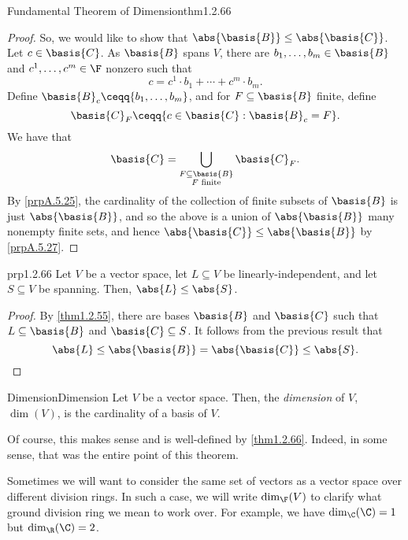 \begin{thm}{Fundamental Theorem of Dimension}{thm1.2.66}
\begin{proof}
		So, we would like to show that $\abs{\basis{B}}\leq \abs{\basis{C}}$.  Let $c\in \basis{C}$.  As $\basis{B}$ spans $V$, there are $b_1,\ldots ,b_m\in \basis{B}$ and $c^1,\ldots ,c^m\in \F$ nonzero such that
		\begin{equation}
			c=c^1\cdot b_1+\cdots +c^m\cdot b_m.
		\end{equation}
		Define $\basis{B}_c\ceqq \{ b_1,\ldots ,b_m\}$, and for $F\subseteq \basis{B}$ finite, define
		\begin{equation}
			\basis{C}_F\ceqq \{ c\in \basis{C}:\basis{B}_c=F\} .
		\end{equation}
		We have that
		\begin{equation}
			\basis{C}=\bigcup _{\substack{F\subseteq \basis{B} \\ F\text{ finite}}}\basis{C}_F.
		\end{equation}
		By \cref{prpA.5.25}, the cardinality of the collection of finite subsets of $\basis{B}$ is just $\abs{\basis{B}}$, and so the above is a union of $\abs{\basis{B}}$ many nonempty finite sets, and hence $\abs{\basis{C}}\leq \abs{\basis{B}}$ by \cref{prpA.5.27}.
	\end{proof}
\end{thm}
\begin{crl}{}{prp1.2.66}
	Let $V$ be a vector space, let $L\subseteq V$ be linearly-independent, and let $S\subseteq V$ be spanning.  Then, $\abs{L}\leq \abs{S}$.
	\begin{proof}
		By \cref{thm1.2.55}, there are bases $\basis{B}$ and $\basis{C}$ such that $L\subseteq \basis{B}$ and $\basis{C}\subseteq S$.  It follows from the previous result that
		\begin{equation}
			\abs{L}\leq \abs{\basis{B}}=\abs{\basis{C}}\leq \abs{S}.
		\end{equation}	
	\end{proof}
\end{crl}
\begin{dfn}{Dimension}{Dimension}
	Let $V$ be a vector space.  Then, the \emph{dimension} of $V$, $\dim (V)$, is the cardinality of a basis of $V$.
	\begin{rmk}
		Of course, this makes sense and is well-defined by \cref{thm1.2.66}.  Indeed, in some sense, that was the entire point of this theorem.
	\end{rmk}
	\begin{rmk}
		Sometimes we will want to consider the same set of vectors as a vector space over different division rings.  In such a case, we will write $\dim _{\F}(V)$ to clarify what ground division ring we mean to work over.  For example, we have $\dim _{\C}(\C )=1$ but $\dim _{\R}(\C )=2$.
	\end{rmk}
\end{dfn}
